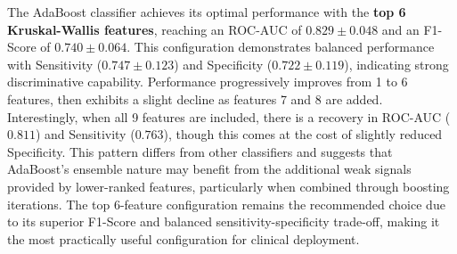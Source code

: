 \documentclass[12pt,a4paper]{article}
\begin{document}
\begin{table}[H]
    \centering
    \caption{Performance of AdaBoost Classifier with Top N Kruskal-Wallis Features (Mean $\pm$ STD).}
    \label{tab:adaboost_kruskal_metrics}
\end{table}

The AdaBoost classifier achieves its optimal performance with the \textbf{top 6 Kruskal-Wallis features}, reaching an ROC-AUC of $0.829 \pm 0.048$ and an F1-Score of $0.740 \pm 0.064$. This configuration demonstrates balanced performance with Sensitivity ($0.747 \pm 0.123$) and Specificity ($0.722 \pm 0.119$), indicating strong discriminative capability. Performance progressively improves from 1 to 6 features, then exhibits a slight decline as features 7 and 8 are added. Interestingly, when all 9 features are included, there is a recovery in ROC-AUC ($0.811$) and Sensitivity ($0.763$), though this comes at the cost of slightly reduced Specificity. This pattern differs from other classifiers and suggests that AdaBoost's ensemble nature may benefit from the additional weak signals provided by lower-ranked features, particularly when combined through boosting iterations. The top 6-feature configuration remains the recommended choice due to its superior F1-Score and balanced sensitivity-specificity trade-off, making it the most practically useful configuration for clinical deployment.
\end{document}
